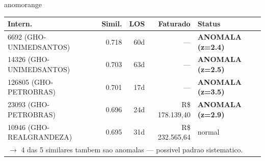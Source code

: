 \documentclass[a4paper,10pt]{article}
\begin{document}
\begin{anomalycard}[Internacao 164595 | GHO-PETROBRAS | ALTO (z=3.38)]{anomorange}
\begin{tabular}{l r r r l}\toprule\textbf{Intern.} & \textbf{Simil.} & \textbf{LOS} & \textbf{Faturado} & \textbf{Status} \\\midrule
6692 (GHO-UNIMEDSANTOS) & 0.718 & 60d & --- & \textcolor{anomred}{\textbf{ANOMALA (z=2.4)}} \\
14326 (GHO-UNIMEDSANTOS) & 0.703 & 63d & --- & \textcolor{anomred}{\textbf{ANOMALA (z=2.5)}} \\
126805 (GHO-PETROBRAS) & 0.701 & 17d & --- & \textcolor{anomred}{\textbf{ANOMALA (z=3.5)}} \\
23093 (GHO-PETROBRAS) & 0.696 & 24d & R\$ 178.139,40 & \textcolor{anomred}{\textbf{ANOMALA (z=2.9)}} \\
10946 (GHO-REALGRANDEZA) & 0.695 & 31d & R\$ 232.565,64 & \textcolor{jcubeblue}{normal} \\
\multicolumn{5}{l}{\textcolor{anomred}{\small $\rightarrow$ 4 das 5 similares tambem sao anomalas --- possivel padrao sistematico.}} \\
\bottomrule\end{tabular}


\end{anomalycard}

\newpage
\end{document}
